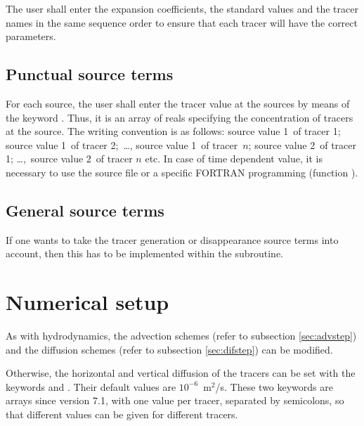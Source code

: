 The user shall enter the expansion coefficients, the standard values and the
tracer names in the same sequence order to ensure that each tracer will have
the correct parameters.

\subsection{Punctual source terms}

For each source, the user shall enter the tracer value at the sources by means
of the keyword . Thus, it is an
array of reals specifying the concentration of tracers at the source. The
writing convention is as follows: source value 1~of tracer 1; source value 1~of
tracer 2;~\dots , source value 1~of tracer~$n$; source value 2~of tracer
1; \dots ,~source value 2~of tracer $n$ etc. In case of time dependent
value, it is necessary to use the source file or a specific FORTRAN programming
(function ).


\subsection{General source terms}

If one wants to take the tracer generation or disappearance source terms into
account, then this has to be implemented within the 
subroutine.

\section{Numerical setup}

As with hydrodynamics, the advection schemes  (refer to subsection \ref{sec:advstep}) and the diffusion schemes
 (refer to subsection
\ref{sec:difstep}) can be modified.

Otherwise, the horizontal and vertical diffusion of the tracers can be set with
the keywords  and
. Their default values
are $10^{-6}$~m${}^{2}$/s.
These two keywords are arrays since version 7.1, with one value per tracer,
separated by semicolons, so that different values can be given for different
tracers.
